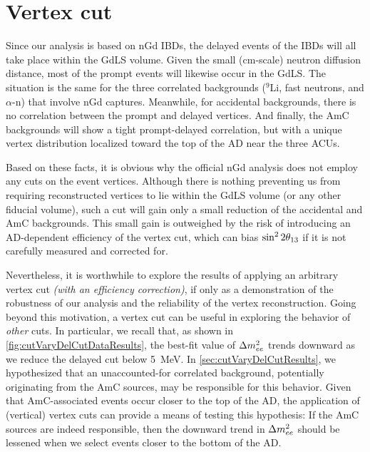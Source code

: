 \documentclass[../thesis.tex]{subfiles}
\begin{document}
\section{Vertex cut}
\label{sec:cutVaryVertexCut}

\begin{comment}
  XXX Do our adjustments of background rates account for the fact that some backgrounds can occur in the GdLS+LS whereas others occur only in GdLS?

Accidentals -- Handled automatically, no adjustment, we're good
Li9, fast-n, alpha-n: Only in GdLS, ???
AmC: Both. R distribution unknown but probably ``lumpy''. Z probably like what we did.
\end{comment}

Since our analysis is based on nGd IBDs, the delayed events of the IBDs will all take place within the GdLS volume. Given the small (cm-scale) neutron diffusion distance, most of the prompt events will likewise occur in the GdLS.
The situation is the same for the three correlated backgrounds ($^9$Li, fast neutrons, and $\alpha$-n) that involve nGd captures.
%
Meanwhile, for accidental backgrounds, there is no correlation between the prompt and delayed vertices.
And finally, the AmC backgrounds will show a tight prompt-delayed correlation, but with a unique vertex distribution localized toward the top of the AD near the three ACUs.

Based on these facts, it is obvious why the official nGd analysis does not employ any cuts on the event vertices. Although there is nothing preventing us from requiring reconstructed vertices to lie within the GdLS volume (or any other fiducial volume), such a cut will gain only a small reduction of the accidental and AmC backgrounds. This small gain is outweighed by the risk of introducing an AD-dependent efficiency of the vertex cut, which can bias $\sin^2 2\theta_{13}$ if it is not carefully measured and corrected for.

Nevertheless, it is worthwhile to explore the results of applying an arbitrary vertex cut \emph{(with an efficiency correction)}, if only as a demonstration of the robustness of our analysis and the reliability of the vertex reconstruction. Going beyond this motivation, a vertex cut can be useful in exploring the behavior of \emph{other} cuts. In particular, we recall that, as shown in \autoref{fig:cutVaryDelCutDataResults}, the best-fit value of $\Delta m^2_{ee}$ trends downward as we reduce the delayed cut below 5~MeV. In \autoref{sec:cutVaryDelCutResults}, we hypothesized that an unaccounted-for correlated background, potentially originating from the AmC sources, may be responsible for this behavior. Given that AmC-associated events occur closer to the top of the AD, the application of (vertical) vertex cuts can provide a means of testing this hypothesis: If the AmC sources are indeed responsible, then the downward trend in $\Delta m^2_{ee}$ should be lessened when we select events closer to the bottom of the AD\@.
\end{document}

